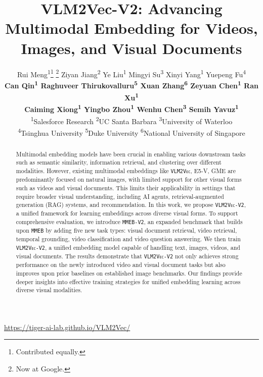 \documentclass[10pt]{article} %
\title{VLM2Vec-V2: Advancing Multimodal Embedding for Videos, Images, and Visual Documents}
\author{Rui Meng\textsuperscript{1}\thanks{Contributed equally.} \thanks{Now at Google.} \quad
    Ziyan Jiang\textsuperscript{2}\footnotemark[1] \quad
    Ye Liu\textsuperscript{1} \quad
    Mingyi Su\textsuperscript{3} \quad
    Xinyi Yang\textsuperscript{1} \quad
    Yuepeng Fu\textsuperscript{4} \\
    \textbf{Can Qin\textsuperscript{1} \quad
    Raghuveer Thirukovalluru\textsuperscript{5} \quad
    Xuan Zhang\textsuperscript{6} \quad
    Zeyuan Chen\textsuperscript{1} \quad
    Ran Xu\textsuperscript{1} \quad \\
    \textbf{
    Caiming Xiong\textsuperscript{1} \quad
    Yingbo Zhou\textsuperscript{1}} \quad
    Wenhu Chen\textsuperscript{3} \quad
    Semih Yavuz\textsuperscript{1}}
    \\[\medskipamount]
    \textsuperscript{1}Salesforce Research \quad
    \textsuperscript{2}UC Santa Barbara \quad
    \textsuperscript{3}University of Waterloo \\
    \textsuperscript{4}Tsinghua University  \quad
    \textsuperscript{5}Duke University \quad
    \textsuperscript{6}National University of Singapore
}
\newcommand{\model}{\texttt{\textsc{VLM2Vec-V2}}\xspace}
\newcommand{\benchmark}{\texttt{\textsc{MMEB-V2}}\xspace}
\newcommand{\mmeb}{\texttt{\textsc{MMEB}}\xspace}
\newcommand{\vlmvec}{\texttt{\textsc{VLM2Vec}}\xspace}
\begin{document}
\maketitle

{
\begin{center}
\vspace{-2em}
\url{https://tiger-ai-lab.github.io/VLM2Vec/}
\end{center}
}

\begin{abstract}
Multimodal embedding models have been crucial in enabling various downstream tasks such as semantic similarity, information retrieval, and clustering over different modalities. However, existing multimodal embeddings like \vlmvec, E5-V, GME are predominantly focused on natural images, with limited support for other visual forms such as videos and visual documents. This limits their applicability in settings that require broader visual understanding, including AI agents, retrieval-augmented generation (RAG) systems, and recommendation.
In this work, we propose \model, a unified framework for learning embeddings across diverse visual forms. 
To support comprehensive evaluation, we introduce \benchmark, an expanded benchmark that builds upon \mmeb by adding five new task types: visual document retrieval, video retrieval, temporal grounding, video classification and video question answering.
We then train \model, a unified embedding model capable of handling text, images, videos, and visual documents. The results demonstrate that \model not only achieves strong performance on the newly introduced video and visual document tasks but also improves upon prior baselines on established image benchmarks. Our findings provide deeper insights into effective training strategies for unified embedding learning across diverse visual modalities.
\end{abstract}











\appendix

\end{document}
